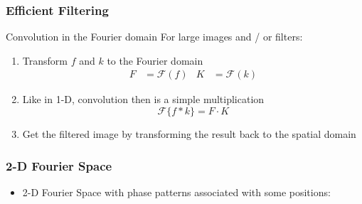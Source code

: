 \begin{frame}
    \frametitle{Efficient Filtering}
    \begin{block}{Convolution in the Fourier domain}
        For large images and /  or filters:
        \begin{enumerate}
            \item Transform $f$ and $k$ to the Fourier domain
                  \begin{align*}
                      F & =	\mathcal{F}(f) & K & = \mathcal{F}(k)
                  \end{align*}
            \item Like in 1-D, convolution then is a simple multiplication
                  \begin{equation*}
                      \mathcal{F}\lbrace f\ast k\rbrace = F\cdot K
                  \end{equation*}
            \item Get the filtered image by transforming the result back to the
                  spatial domain
        \end{enumerate}
    \end{block}

\end{frame}

\begin{frame}
	\frametitle{2-D Fourier Space}
	
	\begin{itemize}
		\item 2-D Fourier Space with phase patterns associated with some positions:
	\end{itemize}
	
	\vspace{-2ex}
	
	\begin{center}
		
	\end{center}
\end{frame}


